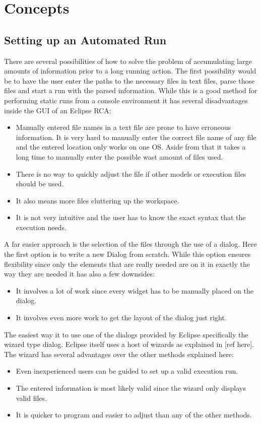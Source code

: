 \chapter{Concepts}
\label{chapter:AutoConcepts}

\section{Setting up an Automated Run}
\label{section:AutoConceptsSetup}
There are several possibilities of how to solve the problem of accumulating
large amounts of information prior to a long running action.
The first possibility would be to have the user enter the paths to the 
necessary files in text files, parse those files and start a run with
the parsed information. While this is a good method for performing
static runs from a console environment it has several disadvantages
inside the GUI of an Eclipse RCA:
\begin{itemize}
 \item Manually entered file names in a text file are prone to have erroneous information.
It is very hard to manually enter the correct file name of any file and the entered location
only works on one OS. Aside from that it takes a long time to manually enter the possible wast
amount of files used.
 \item There is no way to quickly adjust the file if other models or execution files should be used.
 \item It also means more files cluttering up the workspace.
 \item It is not very intuitive and the user has to know the exact syntax that the execution needs.
\end{itemize}

A far easier approach is the selection of the files through the use of a dialog.
Here the first option is to write a new Dialog from scratch. While this option
ensures flexibility since only the elements that are really needed are on it in
exactly the way they are needed it has also a few downsides:
\begin{itemize}
 \item It involves a lot of work since every widget has to be manually placed on the dialog.
 \item It involves even more work to get the layout of the dialog just right.
\end{itemize}

The easiest way it to use one of the dialogs provided by Eclipse specifically the wizard type dialog.
Eclipse itself uses a host of wizards as explained in [ref here].
The wizard has several advantages over the other methods explained here:
\begin{itemize}
 \item Even inexperienced users can be guided to set up a valid execution run.
 \item The entered information is most likely valid since the wizard only displays valid files.
 \item It is quicker to program and easier to adjust than any of the other methods.
\end{itemize}


